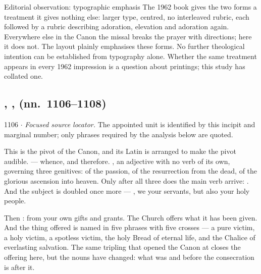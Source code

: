 \begin{proposal}{Editorial observation: typographic emphasis}
The 1962 book gives the two forms a treatment it gives nothing else: larger
type, centred, no interleaved rubric, each followed by a rubric describing
adoration, elevation and adoration again. Everywhere else in the Canon the
missal breaks the prayer with directions; here it does not. The layout plainly
emphasises these forms. No further theological intention can be established
from typography alone. Whether the same treatment appears in every 1962
impression is a question about printings; this study has collated one.
\end{proposal}

\subsection*{, ,  (nn.~1106--1108)}

\begin{appointed}{1106 $\cdot$ }
\textit{Focused source locator.} The appointed unit is identified by this incipit and marginal number; only phrases required by the analysis below are quoted.
\end{appointed}

This is the pivot of the Canon, and its Latin is arranged to make the pivot
audible.  --- whence, and therefore. , an
adjective with no verb of its own, governing three genitives: of the passion, of
the resurrection from the dead, of the glorious ascension into heaven. Only
after all three does the main verb arrive: . And the
subject is doubled once more --- , we your servants, but also your holy people.

Then : from your own gifts and grants. The
Church offers what it has been given. And the thing offered is named in five
phrases with five crosses --- a pure victim, a holy victim, a spotless victim,
the holy Bread of eternal life, and the Chalice of everlasting salvation. The
same tripling that opened the Canon at  closes the offering here, but the nouns have
changed: what was  and  before the consecration
is  after it.

